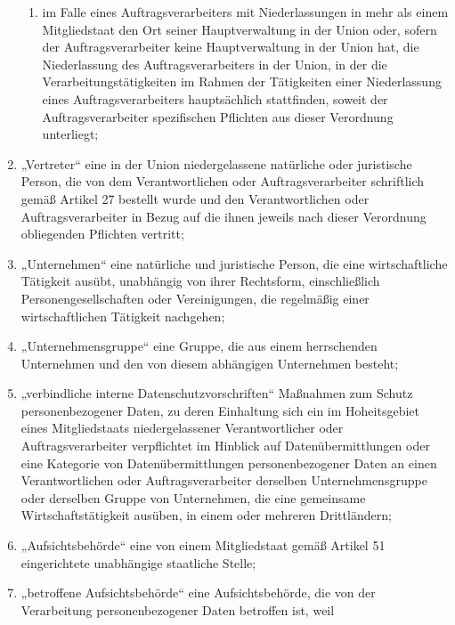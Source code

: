 \begin{enumerate}
\begin{enumerate}
    \item im Falle eines Auftragsverarbeiters mit Niederlassungen in mehr als einem Mitgliedstaat den Ort seiner
     Hauptverwaltung in der Union oder, sofern der Auftragsverarbeiter keine Hauptverwaltung in der Union hat, die
     Niederlassung des Auftragsverarbeiters in der Union, in der die Verarbeitungstätigkeiten im Rahmen der Tätigkeiten
     einer Niederlassung eines Auftragsverarbeiters hauptsächlich stattfinden, soweit der Auftragsverarbeiter
     spezifischen Pflichten aus dieser Verordnung unterliegt;

  \end{enumerate}

  \item „Vertreter“ eine in der Union niedergelassene natürliche oder juristische Person, die von dem Verantwortlichen
   oder Auftragsverarbeiter schriftlich gemäß Artikel 27 bestellt wurde und den Verantwortlichen oder
   Auftragsverarbeiter in Bezug auf die ihnen jeweils nach dieser Verordnung obliegenden Pflichten vertritt;

  \item „Unternehmen“ eine natürliche und juristische Person, die eine wirtschaftliche Tätigkeit ausübt, unabhängig von
   ihrer Rechtsform, einschließlich Personengesellschaften oder Vereinigungen, die regelmäßig einer wirtschaftlichen
   Tätigkeit nachgehen;

  \item „Unternehmensgruppe“ eine Gruppe, die aus einem herrschenden Unternehmen und den von diesem abhängigen
   Unternehmen besteht;

  \item „verbindliche interne Datenschutzvorschriften“ Maßnahmen zum Schutz personenbezogener Daten, zu deren Einhaltung
   sich ein im Hoheitsgebiet eines Mitgliedstaats niedergelassener Verantwortlicher oder Auftragsverarbeiter
   verpflichtet im Hinblick auf Datenübermittlungen oder eine Kategorie von Datenübermittlungen personenbezogener Daten
   an einen Verantwortlichen oder Auftragsverarbeiter derselben Unternehmensgruppe oder derselben Gruppe von
   Unternehmen, die eine gemeinsame Wirtschaftstätigkeit ausüben, in einem oder mehreren Drittländern;

  \item „Aufsichtsbehörde“ eine von einem Mitgliedstaat gemäß Artikel 51 eingerichtete unabhängige staatliche Stelle;

  \item „betroffene Aufsichtsbehörde“ eine Aufsichtsbehörde, die von der Verarbeitung personenbezogener Daten betroffen ist, weil


\end{enumerate}
